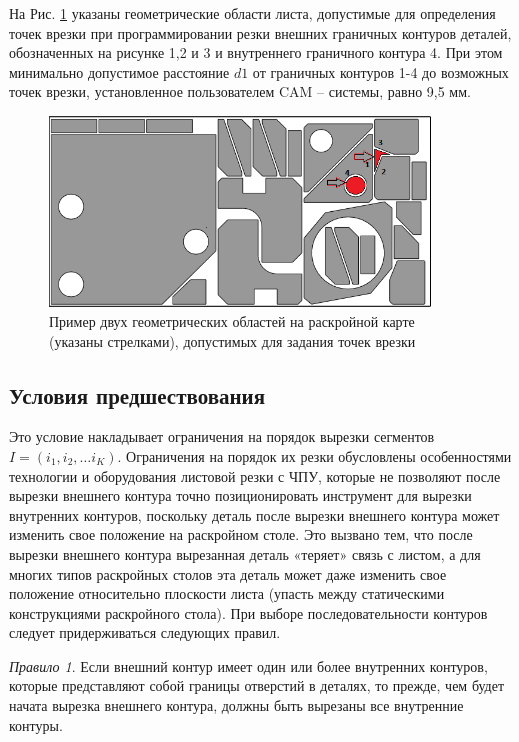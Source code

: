 \documentclass[12pt]{report}
\begin{document}
На Рис. \ref{pierce-area} указаны геометрические области листа,
допустимые для определения точек врезки при программировании резки
внешних граничных контуров деталей,
обозначенных на рисунке 1,2 и 3 и внутреннего граничного контура 4.
При этом минимально допустимое расстояние $d1$ от граничных контуров 1-4 до возможных точек врезки,
установленное пользователем CAM – системы, равно 9,5 мм.

\begin{figure}
  \begin{center}
  \includegraphics[width=0.9\textwidth]{pierce-area.png}
  \caption{Пример двух геометрических областей на раскройной карте (указаны стрелками),
допустимых для задания точек врезки }
  \label{pierce-area}
  \end{center}
\end{figure}

\subsection{Условия предшествования}

Это условие накладывает ограничения на порядок вырезки сегментов
$ I = (i_1, i_2, \dots i_K)$.
Ограничения на порядок их резки обусловлены особенностями
технологии и оборудования листовой резки с ЧПУ,
которые не позволяют после вырезки внешнего контура точно
позиционировать инструмент для вырезки внутренних контуров,
поскольку деталь после вырезки внешнего контура может
изменить свое положение на раскройном столе.
Это вызвано тем, что после вырезки внешнего контура
вырезанная деталь «теряет» связь с листом,
а для многих типов раскройных столов эта деталь
может даже изменить свое положение относительно плоскости листа
(упасть между статическими конструкциями раскройного стола).
При выборе последовательности контуров следует придерживаться следующих правил.

{\it Правило 1}.
Если внешний контур имеет один или более внутренних контуров,
которые представляют собой границы отверстий в деталях,
то прежде, чем будет начата вырезка внешнего контура,
должны быть вырезаны все внутренние контуры.
\end{document}
